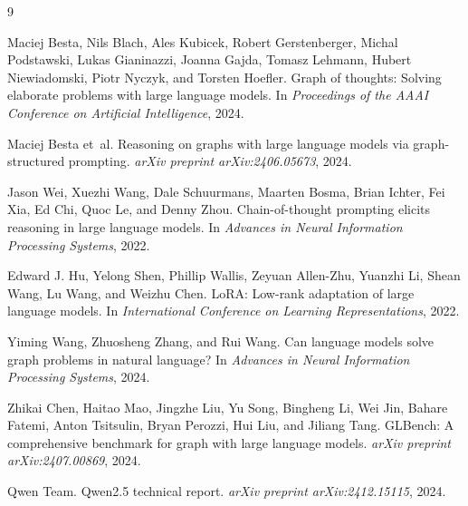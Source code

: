 \documentclass[sigplan,screen]{acmart}
\begin{document}
\begin{thebibliography}{9}

Maciej Besta, Nils Blach, Ales Kubicek, Robert Gerstenberger, Michal Podstawski, Lukas Gianinazzi, Joanna Gajda, Tomasz Lehmann, Hubert Niewiadomski, Piotr Nyczyk, and Torsten Hoefler.
\newblock Graph of thoughts: Solving elaborate problems with large language models.
\newblock In \emph{Proceedings of the AAAI Conference on Artificial Intelligence}, 2024.

Maciej Besta et~al.
\newblock Reasoning on graphs with large language models via graph-structured prompting.
\newblock \emph{arXiv preprint arXiv:2406.05673}, 2024.

Jason Wei, Xuezhi Wang, Dale Schuurmans, Maarten Bosma, Brian Ichter, Fei Xia, Ed Chi, Quoc Le, and Denny Zhou.
\newblock Chain-of-thought prompting elicits reasoning in large language models.
\newblock In \emph{Advances in Neural Information Processing Systems}, 2022.

Edward J. Hu, Yelong Shen, Phillip Wallis, Zeyuan Allen-Zhu, Yuanzhi Li, Shean Wang, Lu Wang, and Weizhu Chen.
\newblock LoRA: Low-rank adaptation of large language models.
\newblock In \emph{International Conference on Learning Representations}, 2022.

Yiming Wang, Zhuosheng Zhang, and Rui Wang.
\newblock Can language models solve graph problems in natural language?
\newblock In \emph{Advances in Neural Information Processing Systems}, 2024.

Zhikai Chen, Haitao Mao, Jingzhe Liu, Yu Song, Bingheng Li, Wei Jin, Bahare Fatemi, Anton Tsitsulin, Bryan Perozzi, Hui Liu, and Jiliang Tang.
\newblock GLBench: A comprehensive benchmark for graph with large language models.
\newblock \emph{arXiv preprint arXiv:2407.00869}, 2024.

Qwen Team.
\newblock Qwen2.5 technical report.
\newblock \emph{arXiv preprint arXiv:2412.15115}, 2024.

\end{thebibliography}
\end{document}
